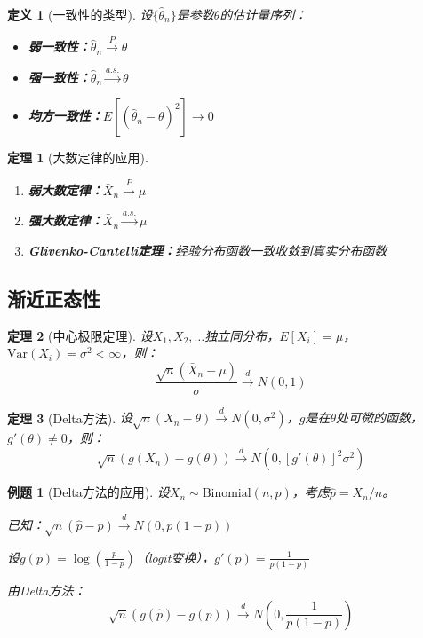 \documentclass[12pt,a4paper]{article}
\newtheorem{theorem}{定理}[section]
\newtheorem{definition}{定义}[section]
\newtheorem{example}{例题}[section]
\theoremstyle{remark}
\begin{document}
\begin{definition}[一致性的类型]
设$\{\hat{\theta}_n\}$是参数$\theta$的估计量序列：
\begin{itemize}
\item \textbf{弱一致性：}$\hat{\theta}_n \stackrel{P}{\to} \theta$
\item \textbf{强一致性：}$\hat{\theta}_n \stackrel{a.s.}{\to} \theta$
\item \textbf{均方一致性：}$E[(\hat{\theta}_n - \theta)^2] \to 0$
\end{itemize}
\end{definition}

\begin{theorem}[大数定律的应用]
\begin{enumerate}
\item \textbf{弱大数定律：}$\bar{X}_n \stackrel{P}{\to} \mu$
\item \textbf{强大数定律：}$\bar{X}_n \stackrel{a.s.}{\to} \mu$
\item \textbf{Glivenko-Cantelli定理：}经验分布函数一致收敛到真实分布函数
\end{enumerate}
\end{theorem}

\subsection{渐近正态性}

\begin{theorem}[中心极限定理]
设$X_1, X_2, \ldots$独立同分布，$E[X_i] = \mu$，$\text{Var}(X_i) = \sigma^2 < \infty$，则：
$$\frac{\sqrt{n}(\bar{X}_n - \mu)}{\sigma} \stackrel{d}{\to} N(0, 1)$$
\end{theorem}

\begin{theorem}[Delta方法]
设$\sqrt{n}(X_n - \theta) \stackrel{d}{\to} N(0, \sigma^2)$，$g$是在$\theta$处可微的函数，$g'(\theta) \neq 0$，则：
$$\sqrt{n}(g(X_n) - g(\theta)) \stackrel{d}{\to} N(0, [g'(\theta)]^2 \sigma^2)$$
\end{theorem}

\begin{example}[Delta方法的应用]
设$X_n \sim \text{Binomial}(n, p)$，考虑$\hat{p} = X_n/n$。

已知：$\sqrt{n}(\hat{p} - p) \stackrel{d}{\to} N(0, p(1-p))$

设$g(p) = \log\left(\frac{p}{1-p}\right)$（logit变换），$g'(p) = \frac{1}{p(1-p)}$

由Delta方法：
$$\sqrt{n}(g(\hat{p}) - g(p)) \stackrel{d}{\to} N\left(0, \frac{1}{p(1-p)}\right)$$
\end{example}
\end{document}
